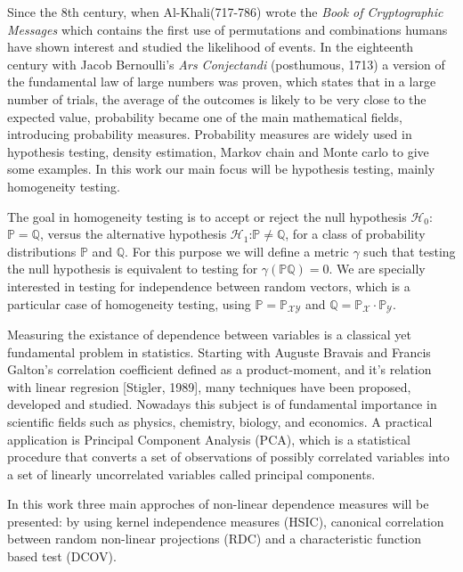 Since the 8th century, when Al-Khali(717-786) wrote the \textit{Book of Cryptographic Messages} which contains the first use of permutations and combinations \cite{historia} humans have shown interest and studied the likelihood of events. In the eighteenth century with Jacob Bernoulli's \textit{Ars Conjectandi} (posthumous, 1713) \cite{bernoulli} a version of the fundamental law of large numbers was proven, which states that in a large number of trials, the average of the outcomes is likely to be very close to the expected value, probability became one of the main mathematical fields, introducing probability measures.  Probability measures are widely used in hypothesis testing, density estimation, Markov chain and Monte carlo to give some examples. In this work our main focus will be hypothesis testing, mainly homogeneity testing. 

The goal in homogeneity testing is to accept or reject the null hypothesis $\mathcal{H}_{0}$:$\mathbb{P}=\mathbb{Q}$, versus the alternative hypothesis $\mathcal{H}_{1}$:$\mathbb{P}\neq\mathbb{Q}$, for a class of probability distributions $\mathbb{P}$ and $\mathbb{Q}$. For this purpose we will define a metric $\gamma$ such that testing the null hypothesis is equivalent to testing for $\gamma(\mathbb{P}\mathbb{Q}) = 0$. We are specially interested in testing for independence between random vectors, which is a particular case of homogeneity testing, using $\mathbb{P} = \mathbb{P}_{\mathcal{XY}}$ and $\mathbb{Q} = \mathbb{P}_{\mathcal{X}}\cdot\mathbb{P}_{\mathcal{Y}}$. 

Measuring the existance of dependence between variables is a classical yet fundamental problem in statistics. Starting with Auguste Bravais and Francis Galton's correlation coefficient defined as a product-moment, and it's relation with linear regresion [Stigler, 1989],  many  techniques  have  been proposed, developed and studied. Nowadays this subject is of fundamental importance in scientific fields such as physics, chemistry, biology, and economics. A practical application is Principal Component Analysis (PCA), which is a statistical procedure that converts a set of observations of possibly correlated variables into a set of linearly uncorrelated variables called principal components. 

In this work three main approches of non-linear dependence measures will be presented: by using kernel independence measures (HSIC), canonical correlation between random non-linear projections (RDC) and a characteristic function based test (DCOV).

